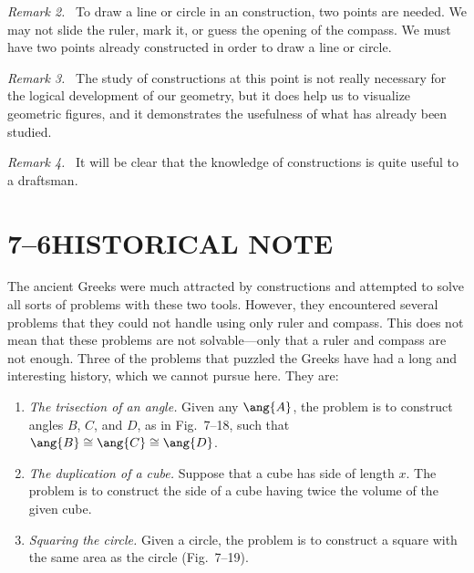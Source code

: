 \documentclass[11pt]{book}
\theoremstyle{bkplain}
\newenvironment{VIIremarkn}[1]%
  {\par\medskip\noindent\emph{Remark #1.}\ }{\par\medskip}
\theoremstyle{XIplainnote}
\theoremstyle{bkplain}
\theoremstyle{bkplain}
\begin{document}
\begin{VIIremarkn}{2}
To draw a line or circle in an \RC{} construction, two points are needed. We
may not slide the ruler, mark it, or guess the opening of the compass. We must
have two points already constructed in order to draw a line or circle.
\end{VIIremarkn}

\begin{VIIremarkn}{3}
The study of \RC{} constructions at this point is not really necessary for the
logical development of our geometry, but it does help us to visualize geometric
figures, and it demonstrates the usefulness of what has already been studied.
\end{VIIremarkn}

\begin{VIIremarkn}{4}
It will be clear that the knowledge of \RC{} constructions is quite useful to a
draftsman.
\end{VIIremarkn}

\section*{7--6\quad HISTORICAL NOTE}

The ancient Greeks were much attracted by \RC{} constructions and attempted to
solve all sorts of problems with these two tools. However, they encountered
several problems that they could not handle using only ruler and compass. This
does not mean that these problems are not solvable---only that a ruler and
compass are not enough. Three of the problems that puzzled the Greeks have had
a long and interesting history, which we cannot pursue here. They are:

\begin{enumerate}[label=(\alph*), leftmargin=2.2em, itemsep=3pt]
\item \emph{The trisection of an angle.} Given any $\ang{A}$, the problem is to
  construct angles $B$, $C$, and $D$, as in Fig.~7--18, such that
  $\ang{B} \cong \ang{C} \cong \ang{D}$.
\item \emph{The duplication of a cube.} Suppose that a cube has side of length
  $x$. The problem is to construct the side of a cube having twice the volume
  of the given cube.
\item \emph{Squaring the circle.} Given a circle, the problem is to construct a
  square with the same area as the circle (Fig.~7--19).
\end{enumerate}
\end{document}
